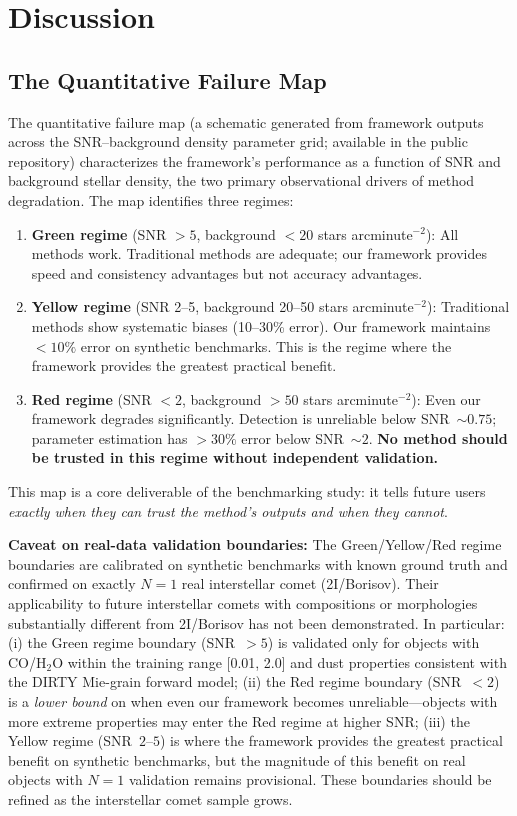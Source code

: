 \documentclass[usenatbib]{mnras}
\begin{document}
\section{Discussion}\label{sec:discussion}

\subsection{The Quantitative Failure Map}\label{sec:failure_map}

The quantitative failure map (a schematic generated from framework outputs across the SNR--background density parameter grid; available in the public repository) characterizes the framework's performance as a function of SNR and background stellar density, the two primary observational drivers of method degradation. The map identifies three regimes:

\begin{enumerate}
    \item \textbf{Green regime} (SNR $>5$, background $<20$ stars arcminute$^{-2}$): All methods work. Traditional methods are adequate; our framework provides speed and consistency advantages but not accuracy advantages.
    \item \textbf{Yellow regime} (SNR 2--5, background 20--50 stars arcminute$^{-2}$): Traditional methods show systematic biases (10--30\% error). Our framework maintains $<10\%$ error on synthetic benchmarks. This is the regime where the framework provides the greatest practical benefit.
    \item \textbf{Red regime} (SNR $<2$, background $>50$ stars arcminute$^{-2}$): Even our framework degrades significantly. Detection is unreliable below SNR~$\sim 0.75$; parameter estimation has $>30\%$ error below SNR~$\sim 2$. \textbf{No method should be trusted in this regime without independent validation.}
\end{enumerate}

This map is a core deliverable of the benchmarking study: it tells future users \textit{exactly when they can trust the method's outputs and when they cannot}.

\textbf{Caveat on real-data validation boundaries:} The Green/Yellow/Red regime boundaries are calibrated on synthetic benchmarks with known ground truth and confirmed on exactly $N=1$ real interstellar comet (2I/Borisov). Their applicability to future interstellar comets with compositions or morphologies substantially different from 2I/Borisov has not been demonstrated. In particular: (i) the Green regime boundary (SNR~$>5$) is validated only for objects with CO/H$_2$O within the training range [0.01, 2.0] and dust properties consistent with the DIRTY Mie-grain forward model; (ii) the Red regime boundary (SNR~$<2$) is a \textit{lower bound} on when even our framework becomes unreliable---objects with more extreme properties may enter the Red regime at higher SNR; (iii) the Yellow regime (SNR~$2$--$5$) is where the framework provides the greatest practical benefit on synthetic benchmarks, but the magnitude of this benefit on real objects with $N=1$ validation remains provisional. These boundaries should be refined as the interstellar comet sample grows.
\end{document}
